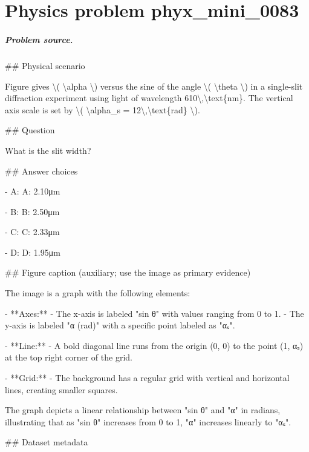 
\chapter{Physics problem phyx\_mini\_0083}
\label{ch:PhyXMiniProblems_problem_phyx_mini_0083}

\paragraph{Problem source.}
\#\# Physical scenario

Figure gives \textbackslash{}( \textbackslash{}alpha \textbackslash{}) versus the sine of the angle \textbackslash{}( \textbackslash{}theta \textbackslash{}) in a single-slit diffraction experiment using light of wavelength 610\textbackslash{},\textbackslash{}text\{nm\}. The vertical axis scale is set by \textbackslash{}( \textbackslash{}alpha\_s = 12\textbackslash{},\textbackslash{}text\{rad\} \textbackslash{}).

\#\# Question

What is the slit width?

\#\# Answer choices

- A: A: 2.10μm

- B: B: 2.50μm

- C: C: 2.33μm

- D: D: 1.95μm

\#\# Figure caption (auxiliary; use the image as primary evidence)

The image is a graph with the following elements:

- **Axes:**
  - The x-axis is labeled "sin θ" with values ranging from 0 to 1.
  - The y-axis is labeled "α (rad)" with a specific point labeled as "αₛ".

- **Line:**
  - A bold diagonal line runs from the origin (0, 0) to the point (1, αₛ) at the top right corner of the grid.

- **Grid:**
  - The background has a regular grid with vertical and horizontal lines, creating smaller squares.

The graph depicts a linear relationship between "sin θ" and "α" in radians, illustrating that as "sin θ" increases from 0 to 1, "α" increases linearly to "αₛ".

\#\# Dataset metadata

